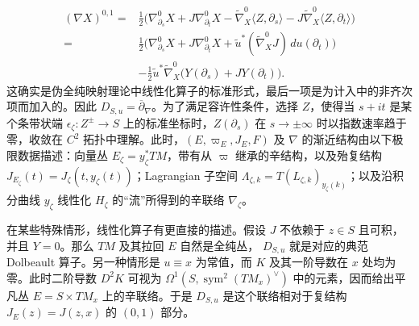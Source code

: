 \[
\begin{aligned}
(\nabla X)^{0,1}
={}&\tfrac12\bigl(\nabla^0_{\partial_s}X+J\nabla^0_{\partial_t}X
-\widetilde\nabla^0_X\langle Z,\partial_s\rangle-J\widetilde\nabla^0_X\langle Z,\partial_t\rangle\bigr)\\
={}&\tfrac12\bigl(\nabla^0_{\partial_s}X+J\nabla^0_{\partial_t}X
+\tilde u^*(\widetilde\nabla^0_XJ)\,du(\partial_t)\bigr)\\
&-\tfrac12\tilde u^*\widetilde\nabla^0_X\bigl(Y(\partial_s)+JY(\partial_t)\bigr).
\end{aligned}
\]
这确实是伪全纯映射理论中线性化算子的标准形式，最后一项是为计入中的非齐次项而加入的。因此 $D_{S,u}=\overline\partial_\nabla$。为了满足容许性条件，选择 $Z$，使得当 $s+it$ 是某个条带状端 $\epsilon_\zeta:Z^\pm\to S$ 上的标准坐标时，$Z(\partial_s)$ 在 $s\to\pm\infty$ 时以指数速率趋于零，收敛在 $C^2$ 拓扑中理解。此时，$(E,\varpi_E,J_E,F)$ 及 $\nabla$ 的渐近结构由以下极限数据描述：向量丛 $E_\zeta=y_\zeta^*TM$，带有从 $\varpi$ 继承的辛结构，以及殆复结构 $J_{E_\zeta}(t)=J_\zeta(t,y_\zeta(t))$；Lagrangian 子空间 $\Lambda_{\zeta,k}=T(L_{\zeta,k})_{y_\zeta(k)}$；以及沿积分曲线 $y_\zeta$ 线性化 $H_\zeta$ 的“流”所得到的辛联络 $\nabla_\zeta$。

\begin{note}\label{st:8.1}
在某些特殊情形，线性化算子有更直接的描述。假设 $J$ 不依赖于 $z\in S$ 且可积，并且 $Y=0$。那么 $TM$ 及其拉回 $E$ 自然是全纯丛，
$D_{S,u}$ 就是对应的典范 Dolbeault 算子。另一种情形是 $u\equiv x$ 为常值，而 $K$ 及其一阶导数在 $x$ 处均为零。此时二阶导数 $D^2K$ 可视为 $\Omega^1(S,\operatorname{sym}^2(T M_x)^\vee)$ 中的元素，因而给出平凡丛 $E=S\times T M_x$ 上的辛联络。于是 $D_{S,u}$ 是这个联络相对于复结构 $J_E(z)=J(z,x)$ 的 $(0,1)$ 部分。
\end{note}


